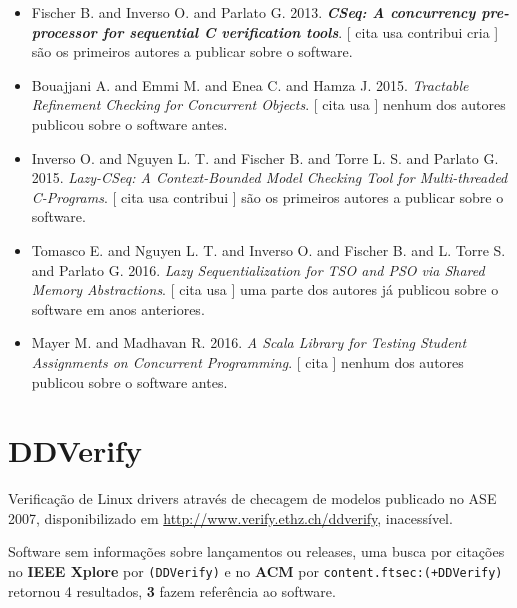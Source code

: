 \begin{itemize}
\item Fischer B. and Inverso O. and Parlato G.
      2013.
        \textbf{\textit{ CSeq: A concurrency pre-processor for sequential C verification tools}}.
      [
          cita
          usa
          contribui
          cria
      ]
são os primeiros autores a publicar sobre o software.
\item Bouajjani A. and Emmi M. and Enea C. and Hamza J.
      2015.
        \textit{ Tractable Refinement Checking for Concurrent Objects}.
      [
          cita
          usa
      ]
nenhum dos autores publicou sobre o software antes.
\item Inverso O. and Nguyen L. T. and Fischer B. and Torre L. S. and Parlato G.
      2015.
        \textit{ Lazy-CSeq: A Context-Bounded Model Checking Tool for Multi-threaded C-Programs}.
      [
          cita
          usa
          contribui
      ]
são os primeiros autores a publicar sobre o software.
\item Tomasco E. and Nguyen L. T. and Inverso O. and Fischer B. and L. Torre S. and Parlato G.
      2016.
        \textit{ Lazy Sequentialization for TSO and PSO via Shared Memory Abstractions}.
      [
          cita
          usa
      ]
uma parte dos autores já publicou sobre o software em anos anteriores.
\item Mayer M. and Madhavan R.
      2016.
        \textit{ A Scala Library for Testing Student Assignments on Concurrent Programming}.
      [
          cita
      ]
nenhum dos autores publicou sobre o software antes.
\end{itemize}
\section{DDVerify}

Verificação de Linux drivers através de checagem de modelos
publicado no ASE 2007,
disponibilizado em \url{http://www.verify.ethz.ch/ddverify},
inacessível.

Software sem informações sobre lançamentos ou releases,
uma busca por citações no {\bf IEEE Xplore} por
\texttt{(DDVerify)}
e no {\bf ACM} por
\texttt{content.ftsec:(+DDVerify)}
retornou
4 resultados,
{\bf 3} fazem referência ao software.


